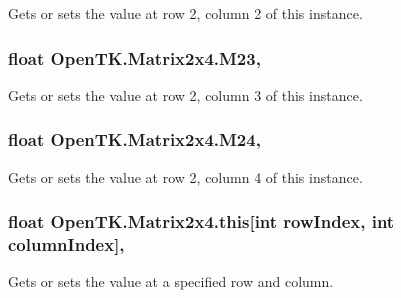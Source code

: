 Gets or sets the value at row 2, column 2 of this instance. 

\hypertarget{struct_open_t_k_1_1_matrix2x4_a0f33e616958bb588e07fe2975eea9db6}{
\subsubsection[{M23}]{\setlength{\rightskip}{0pt plus 5cm}float Open\-T\-K.\-Matrix2x4.\-M23\hspace{0.3cm}{\ttfamily [get]}, {\ttfamily [set]}}}\label{struct_open_t_k_1_1_matrix2x4_a0f33e616958bb588e07fe2975eea9db6}


Gets or sets the value at row 2, column 3 of this instance. 

\hypertarget{struct_open_t_k_1_1_matrix2x4_aad29e542021412a7935ad208b41f5b3f}{
\subsubsection[{M24}]{\setlength{\rightskip}{0pt plus 5cm}float Open\-T\-K.\-Matrix2x4.\-M24\hspace{0.3cm}{\ttfamily [get]}, {\ttfamily [set]}}}\label{struct_open_t_k_1_1_matrix2x4_aad29e542021412a7935ad208b41f5b3f}


Gets or sets the value at row 2, column 4 of this instance. 

\hypertarget{struct_open_t_k_1_1_matrix2x4_a980938d7d213208b12e2de4671099b80}{
\subsubsection[{this[int row\-Index, int column\-Index]}]{\setlength{\rightskip}{0pt plus 5cm}float Open\-T\-K.\-Matrix2x4.\-this\mbox{[}int row\-Index, int column\-Index\mbox{]}\hspace{0.3cm}{\ttfamily [get]}, {\ttfamily [set]}}}\label{struct_open_t_k_1_1_matrix2x4_a980938d7d213208b12e2de4671099b80}


Gets or sets the value at a specified row and column. 

